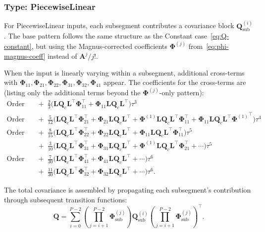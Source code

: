 \documentclass[11pt,a4paper]{article}
\newcommand{\bPhi}{\bm{\Phi}}
\newcommand{\bA}{\mathbf{A}}
\newcommand{\bQ}{\mathbf{Q}}
\newcommand{\bL}{\mathbf{L}}
\begin{document}
\subsubsection{Type: PiecewiseLinear}
\label{sec:Q-pwl}

For PiecewiseLinear inputs, each subsegment contributes a covariance block $\bQ_{\mathrm{sub}}^{(i)}$.
The base pattern follows the same structure as the Constant case~\eqref{eq:Q-constant}, but using the Magnus-corrected coefficients $\bPhi^{(j)}$ from~\eqref{eq:phi-magnus-coeff} instead of $\bA^j/j!$.

When the input is linearly varying within a subsegment, additional cross-terms with $\bPhi_{11}, \bPhi_{21}, \bPhi_{22}, \bPhi_{31}, \bPhi_{32}, \bPhi_{41}$ appear.
The coefficients for the cross-terms are (listing only the additional terms beyond the $\bPhi^{(j)}$-only pattern):
\begin{align}
    \text{Order 3:}&\quad +\;\tfrac{2}{3}\bigl(\bL\bQ_c\bL^\top\bPhi_{11}^\top + \bPhi_{11}\bL\bQ_c\bL^\top\bigr)\tau^3 \nonumber\\
    \text{Order 4:}&\quad +\;\tfrac{5}{12}\bigl(\bL\bQ_c\bL^\top\bPhi_{21}^\top + \bPhi_{21}\bL\bQ_c\bL^\top + \bPhi^{(1)}\bL\bQ_c\bL^\top\bPhi_{11}^\top + \bPhi_{11}\bL\bQ_c\bL^\top{\bPhi^{(1)}}^\top\bigr)\tau^4 \nonumber\\
    \text{Order 5:}&\quad +\;\tfrac{8}{15}\bigl(\bL\bQ_c\bL^\top\bPhi_{22}^\top + \bPhi_{22}\bL\bQ_c\bL^\top + \bPhi_{11}\bL\bQ_c\bL^\top\bPhi_{11}^\top\bigr)\tau^5 \nonumber\\
    &\quad +\;\tfrac{3}{10}\bigl(\bL\bQ_c\bL^\top\bPhi_{31}^\top + \bPhi_{31}\bL\bQ_c\bL^\top + \bPhi^{(1)}\bL\bQ_c\bL^\top\bPhi_{21}^\top + \cdots\bigr)\tau^5 \nonumber\\
    \text{Order 6:}&\quad +\;\tfrac{7}{30}\bigl(\bL\bQ_c\bL^\top\bPhi_{41}^\top + \bPhi_{41}\bL\bQ_c\bL^\top + \cdots\bigr)\tau^6 \nonumber\\
    &\quad +\;\tfrac{11}{30}\bigl(\bL\bQ_c\bL^\top\bPhi_{32}^\top + \bPhi_{32}\bL\bQ_c\bL^\top + \cdots\bigr)\tau^6.
    \label{eq:Q-pwl-extra}
\end{align}

The total covariance is assembled by propagating each subsegment's contribution through subsequent transition functions:
\begin{equation}
    \bQ = \sum_{i=0}^{P-2} \left(\prod_{j=i+1}^{P-2}\bPhi_{\mathrm{sub}}^{(j)}\right) \bQ_{\mathrm{sub}}^{(i)} \left(\prod_{j=i+1}^{P-2}\bPhi_{\mathrm{sub}}^{(j)}\right)^\top.
    \label{eq:Q-propagation}
\end{equation}
\end{document}
